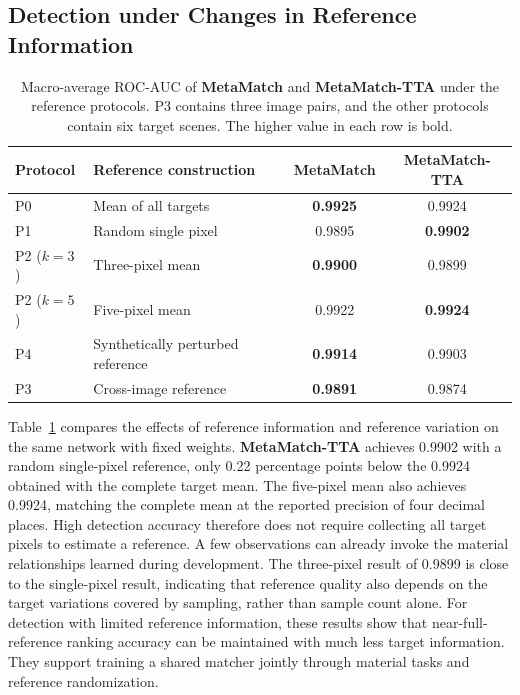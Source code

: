 \documentclass[a4paper,11pt]{article}
\newcommand{\method}{\textbf{MetaMatch-TTA}}
\newcommand{\matcher}{\textbf{MetaMatch}}
\begin{document}
\subsection{Detection under Changes in Reference Information}
\begin{table}[H]\centering\small\setlength{\tabcolsep}{7pt}
\caption{Macro-average ROC-AUC of \matcher{} and \method{} under the reference protocols. P3 contains three image pairs, and the other protocols contain six target scenes. The higher value in each row is bold.}\label{tab:reference_profile}
\begin{tabular}{llcc}\toprule
Protocol & Reference construction & \matcher{} & \method{} \\ \midrule
P0 & Mean of all targets & \textbf{0.9925} & 0.9924 \\
P1 & Random single pixel & 0.9895 & \textbf{0.9902} \\
P2 ($k=3$) & Three-pixel mean & \textbf{0.9900} & 0.9899 \\
P2 ($k=5$) & Five-pixel mean & 0.9922 & \textbf{0.9924} \\
P4 & Synthetically perturbed reference & \textbf{0.9914} & 0.9903 \\
P3 & Cross-image reference & \textbf{0.9891} & 0.9874 \\
\bottomrule\end{tabular}
\end{table}

Table~\ref{tab:reference_profile} compares the effects of reference information and reference variation on the same network with fixed weights. \method{} achieves 0.9902 with a random single-pixel reference, only 0.22 percentage points below the 0.9924 obtained with the complete target mean. The five-pixel mean also achieves 0.9924, matching the complete mean at the reported precision of four decimal places. High detection accuracy therefore does not require collecting all target pixels to estimate a reference. A few observations can already invoke the material relationships learned during development. The three-pixel result of 0.9899 is close to the single-pixel result, indicating that reference quality also depends on the target variations covered by sampling, rather than sample count alone. For detection with limited reference information, these results show that near-full-reference ranking accuracy can be maintained with much less target information. They support training a shared matcher jointly through material tasks and reference randomization.
\end{document}
